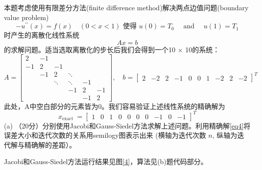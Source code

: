 \documentclass[12pt,a4paper,UTF8]{ctexart}
\begin{document}
\begin{enumerate}
          本题考虑使用有限差分方法(finite difference method)解决两点边值问题(boundary
          value problem)
          \begin{equation}
              -u^{\prime \prime}(x)=f(x) \quad(0<x<1) \text { 使得 } u(0)=T_{0} \quad \text { and } \quad u(1)=T_{1}
          \end{equation}
          时产生的离散化线性系统
          \begin{equation}
              A x=b
          \end{equation}
          的求解问题。适当选取离散化的步长后我们会得到一个10 × 10的系统：
          \begin{equation}
              A=\left[\begin{array}{rrrrrrrr}
                      2  & -1 &        &        &    &    \\
                      -1 & 2  & -1     &        &    &    \\
                         & -1 & 2      & \ddots &    &    \\
                         &    & \ddots & \ddots & -1 &    \\
                         &    &        & -1     & 2  & -1 \\
                         &    &        &        & -1 & 2
                  \end{array}\right], \quad b=\left[\begin{array}{llllllllll}
                      2 & -2 & 2 & -1 & 0 & 0 & 1 & -2 & 2 & -2
                  \end{array}\right]^{T}
          \end{equation}
          此处，A中空白部分的元素皆为0。我们容易验证上述线性系统的精确解为
          \begin{equation}\label{eq4}
              x_{\text {exact }}=\left[\begin{array}{llllllllll}
                      1 & 0 & 1 & 0 & 0 & 0 & 0 & -1 & 0 & -1
                  \end{array}\right]^{T}
          \end{equation}
          (a) （20分）分别使用Jacobi和Gauss-Siedel方法求解上述问题。利用精确解\eqref{eq4}将误差大小和迭代次数的关系用semilogy图表示出来 (横轴为迭代次数 $n$, 纵轴为迭代解与精确解的差距）。

          Jacobi和Gauss-Siedel方法运行结果见图\ref{4}，算法见(b)题代码部分。


\end{enumerate}
\end{document}
